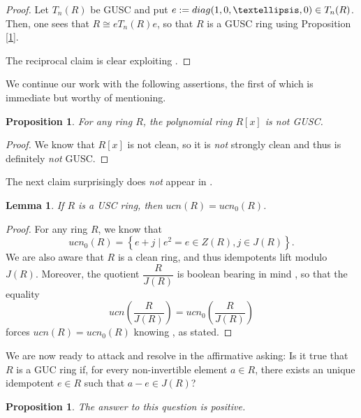 \documentclass[12pt]{amsart}
\newtheorem{proposition}[theorem]{Proposition}
\newtheorem{lemma}[theorem]{Lemma}
\theoremstyle{definition}
\begin{document}
\begin{proof}
Let $T_{n}(R)$ be GUSC and put $e:={\rm diag}(1,0,\ldots ,0)\in T_{n}(R)$. Then, one sees that $R\cong eT_{n}(R)e$, so that $R$ is a GUSC ring using Proposition \ref{1}.

The reciprocal claim is clear exploiting \cite[Theorem 10]{2}.
\end{proof}

We continue our work with the following assertions, the first of which is immediate but worthy of mentioning.

\begin{proposition}\label{prop2.14}
For any ring $R$, the polynomial ring $R[x]$ is not GUSC.
\end{proposition}

\begin{proof}
We know that $R[x]$ is not clean, so it is {\it not} strongly clean and thus is definitely {\it not} GUSC.
\end{proof}

The next claim surprisingly does {\it not} appear in \cite{1}.

\begin{lemma}\label{lem2.18}
If $R$ is a USC ring, then $ucn(R)=ucn_0(R)$.
\end{lemma}

\begin{proof}
For any ring $R$, we know that $$ucn_0(R)=\left\{e+j \mid e^2=e \in Z(R), j \in J(R)\right\}.$$ We are also aware that $R$ is a clean ring, and thus idempotents lift modulo $J(R)$. Moreover, the quotient $\dfrac{R}{J(R)}$ is boolean bearing in mind \cite[Corollary 18]{2}, so that the equality $$ucn\left(\dfrac{R}{J(R)}\right)=ucn_0\left(\dfrac{R}{J(R)}\right)$$ forces $ucn(R)=ucn_{0}(R)$ knowing \cite[Proposition 3.6]{1}, as stated.
\end{proof}

We are now ready to attack and resolve in the affirmative \cite[Question 4.8]{1} asking: Is it true that $R$ is a GUC ring if, for every non-invertible element $a\in R$, there exists an unique idempotent $e\in R$ such that $a-e\in J(R)$?

\begin{proposition}\label{prop2.21}
The answer to this question is positive.
\end{proposition}
\end{document}
